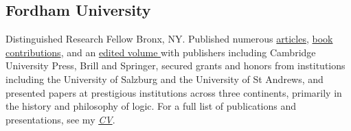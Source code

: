 \subsection{Fordham University}
{}
{Distinguished Research Fellow}
{Bronx, NY. Published numerous \href{https://fordham.academia.edu/jacobarchambault}{articles}, \href{https://www.collegepublications.co.uk/dialogues/?00005}{book} \href{https://www.cambridgescholars.com/hylomorphism-and-mereology}{contributions}, and an \href{https://brill.com/view/journals/viv/56/3-4/viv.56.issue-3-4.xml?language=en}{edited volume }
	with publishers including Cambridge University Press, Brill and Springer, 
	secured grants and honors from institutions including the University of Salzburg and the University of St Andrews,
	and presented papers at prestigious institutions across three continents, 
	primarily in the history and philosophy of logic. 
	For a full list of publications and presentations, see my 
	\href{https://github.com/JacobArchambault/Academic-Papers/blob/master/Professional\%20Documents/resume/cv.pdf}{\emph{CV}}.}
